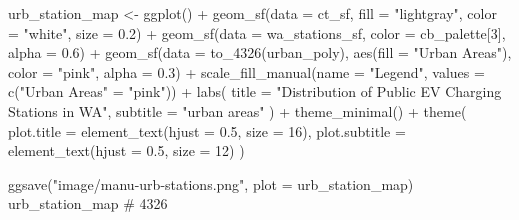 \documentclass[
  letterpaper,
  DIV=11,
  numbers=noendperiod]{scrartcl}
\newenvironment{Shaded}{\begin{snugshade}}{\end{snugshade}}
\newcommand{\AttributeTok}[1]{\textcolor[rgb]{0.40,0.45,0.13}{#1}}
\newcommand{\CommentTok}[1]{\textcolor[rgb]{0.37,0.37,0.37}{#1}}
\newcommand{\DecValTok}[1]{\textcolor[rgb]{0.68,0.00,0.00}{#1}}
\newcommand{\FloatTok}[1]{\textcolor[rgb]{0.68,0.00,0.00}{#1}}
\newcommand{\FunctionTok}[1]{\textcolor[rgb]{0.28,0.35,0.67}{#1}}
\newcommand{\NormalTok}[1]{\textcolor[rgb]{0.00,0.23,0.31}{#1}}
\newcommand{\OtherTok}[1]{\textcolor[rgb]{0.00,0.23,0.31}{#1}}
\newcommand{\SpecialCharTok}[1]{\textcolor[rgb]{0.37,0.37,0.37}{#1}}
\newcommand{\StringTok}[1]{\textcolor[rgb]{0.13,0.47,0.30}{#1}}
\begin{document}
\begin{tcolorbox}[enhanced jigsaw, colframe=quarto-callout-note-color-frame, toprule=.15mm, arc=.35mm, breakable, leftrule=.75mm, bottomrule=.15mm, colback=white, rightrule=.15mm, left=2mm, opacityback=0]
\begin{minipage}[t]{\textwidth - 5.5mm}
\begin{Shaded}
\begin{Highlighting}[]
\NormalTok{urb\_station\_map }\OtherTok{\textless{}{-}} \FunctionTok{ggplot}\NormalTok{() }\SpecialCharTok{+}
  \FunctionTok{geom\_sf}\NormalTok{(}\AttributeTok{data =}\NormalTok{ ct\_sf, }\AttributeTok{fill =} \StringTok{"lightgray"}\NormalTok{, }\AttributeTok{color =} \StringTok{"white"}\NormalTok{, }\AttributeTok{size =} \FloatTok{0.2}\NormalTok{) }\SpecialCharTok{+} 
  \FunctionTok{geom\_sf}\NormalTok{(}\AttributeTok{data =}\NormalTok{ wa\_stations\_sf, }\AttributeTok{color =}\NormalTok{ cb\_palette[}\DecValTok{3}\NormalTok{], }\AttributeTok{alpha =} \FloatTok{0.6}\NormalTok{) }\SpecialCharTok{+}
  \FunctionTok{geom\_sf}\NormalTok{(}\AttributeTok{data =} \FunctionTok{to\_4326}\NormalTok{(urban\_poly), }\FunctionTok{aes}\NormalTok{(}\AttributeTok{fill =} \StringTok{"Urban Areas"}\NormalTok{), }\AttributeTok{color =} \StringTok{"pink"}\NormalTok{, }\AttributeTok{alpha =} \FloatTok{0.3}\NormalTok{) }\SpecialCharTok{+}
  \FunctionTok{scale\_fill\_manual}\NormalTok{(}\AttributeTok{name =} \StringTok{"Legend"}\NormalTok{, }\AttributeTok{values =} \FunctionTok{c}\NormalTok{(}\StringTok{"Urban Areas"} \OtherTok{=} \StringTok{"pink"}\NormalTok{)) }\SpecialCharTok{+}
  \FunctionTok{labs}\NormalTok{(}
    \AttributeTok{title =} \StringTok{"Distribution of Public EV Charging Stations in WA"}\NormalTok{,}
    \AttributeTok{subtitle =} \StringTok{"urban areas"}
\NormalTok{  ) }\SpecialCharTok{+}
  \FunctionTok{theme\_minimal}\NormalTok{() }\SpecialCharTok{+}
  \FunctionTok{theme}\NormalTok{(}
    \AttributeTok{plot.title =} \FunctionTok{element\_text}\NormalTok{(}\AttributeTok{hjust =} \FloatTok{0.5}\NormalTok{, }\AttributeTok{size =} \DecValTok{16}\NormalTok{),}
    \AttributeTok{plot.subtitle =} \FunctionTok{element\_text}\NormalTok{(}\AttributeTok{hjust =} \FloatTok{0.5}\NormalTok{, }\AttributeTok{size =} \DecValTok{12}\NormalTok{)}
\NormalTok{  )}

\FunctionTok{ggsave}\NormalTok{(}\StringTok{"image/manu{-}urb{-}stations.png"}\NormalTok{, }\AttributeTok{plot =}\NormalTok{ urb\_station\_map)}
\NormalTok{urb\_station\_map}
\CommentTok{\# 4326}
\end{Highlighting}
\end{Shaded}


\end{minipage}
\end{tcolorbox}
\end{document}
